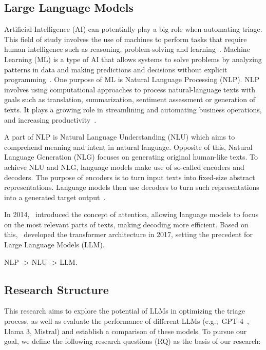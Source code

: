 \subsection{Large Language Models}
\label{subsec:intro-definitions}

Artificial Intelligence (AI) can potentially play a big role when automating triage.
This field of study involves the use of machines to perform tasks that require human intelligence such as reasoning,
problem-solving and learning\ \citep{oed:ai}.
Machine Learning (ML) is a type of AI that allows systems to solve problems by analyzing patterns in data and making
predictions and decisions without explicit programming\ \citep{oed:ml}.
One purpose of ML is Natural Language Processing (NLP).
NLP involves using computational approaches to process natural-language texts with goals such as translation,
summarization, sentiment assessment or generation of texts.
It plays a growing role in streamlining and automating business operations, and increasing
productivity\ \citep{ibm:siem}.

A part of NLP is Natural Language Understanding (NLU) which aims to comprehend meaning and intent in natural language.
Opposite of this, Natural Language Generation (NLG) focuses on generating original human-like texts.
To achieve NLU and NLG, language models make use of so-called encoders and decoders.
The purpose of encoders is to turn input texts into fixed-size abstract representations.
Language models then use decoders to turn such representations into a generated target
output\ \cite{sutskever2014sequence}.

In 2014,\ \citep{bahdanau2014neural} introduced the concept of attention, allowing language models to focus on the most
relevant parts of texts, making decoding more efficient.
Based on this,\ \citet{vaswani2017attention} developed the transformer architecture in 2017, setting the precedent for
Large Language Models (LLM).



NLP -> NLU -> LLM\@.

\subsection{Research Structure}
\label{subsec:intro-research-structure}


This research aims to explore the potential of LLMs in optimizing the triage process, as well as evaluate the
performance of different LLMs (e.g.,\ GPT-4\ \citep{achiam2023gpt}, Llama 3, Mistral) and establish a comparison of
these models.
To pursue our goal, we define the following research questions (RQ) as the basis of our research:

